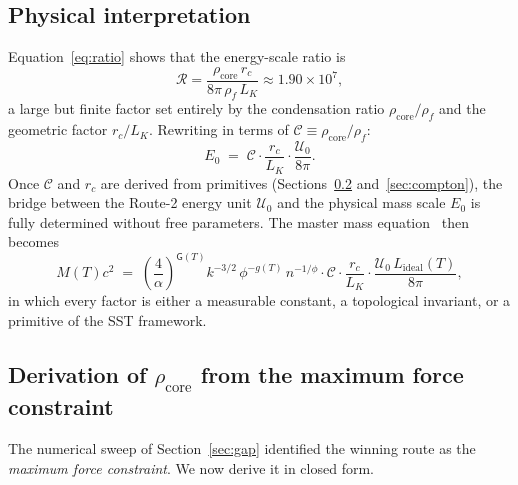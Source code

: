 \documentclass[11pt,a4paper]{article}
\newcommand{\rc}{r_c}
\newcommand{\rhof}{\rho_{\!f}}
\newcommand{\rhocore}{\rho_{\!\mathrm{core}}}
\begin{document}
\subsection{Physical interpretation}

Equation~\eqref{eq:ratio} shows that the energy-scale ratio is
\begin{equation}
  \mathcal{R}
  = \frac{\rhocore\,\rc}{8\pi\,\rhof\,L_K}
  \approx 1.90\times10^7,
\end{equation}
a large but finite factor set entirely by the condensation ratio
$\rhocore/\rhof$ and the geometric factor $\rc/L_K$.  Rewriting
in terms of $\mathcal{C}\equiv\rhocore/\rhof$:
\begin{equation}
  E_0
  \;=\; \mathcal{C}\cdot\frac{\rc}{L_K}\cdot\frac{\mathcal{U}_0}{8\pi}.
  \label{eq:E0_from_condensation}
\end{equation}
Once $\mathcal{C}$ and $\rc$ are derived from primitives
(Sections~\ref{subsec:rhocore} and~\ref{sec:compton}), the bridge
between the Route-2 energy unit $\mathcal{U}_0$ and the physical
mass scale $E_0$ is fully determined without free parameters.
The master mass equation~\cite{IskandaraniSST59} then becomes
\begin{equation}
  M(T)c^2
  \;=\;
  \left(\frac{4}{\alpha}\right)^{\mathsf{G}(T)}
  k^{-3/2}\,\phi^{-g(T)}\,n^{-1/\phi}
  \cdot \mathcal{C}\cdot\frac{\rc}{L_K}\cdot
  \frac{\mathcal{U}_0\,L_{\mathrm{ideal}}(T)}{8\pi},
  \label{eq:master_revised}
\end{equation}
in which every factor is either a measurable constant, a
topological invariant, or a primitive of the SST framework.

\subsection{Derivation of $\rhocore$ from the maximum force constraint}
\label{subsec:rhocore}

The numerical sweep of Section~\ref{sec:gap} identified the winning
route as the \emph{maximum force constraint}.  We now derive it in
closed form.
\end{document}

